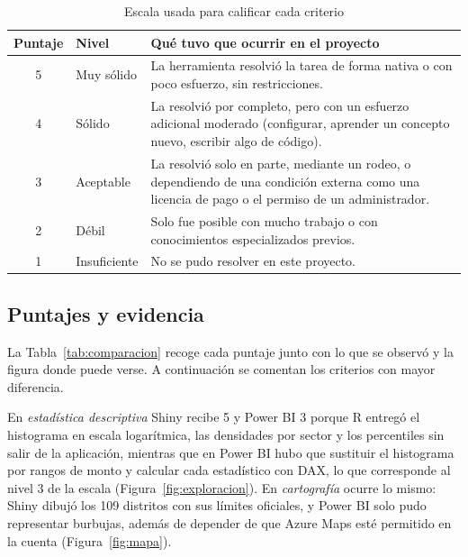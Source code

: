 \documentclass[12pt,a4paper]{article}
\begin{document}
\begin{table}[H]\centering\small
\caption{Escala usada para calificar cada criterio}\label{tab:escala}
\begin{tabularx}{\textwidth}{c l X}
\toprule
\textbf{Puntaje} & \textbf{Nivel} & \textbf{Qué tuvo que ocurrir en el proyecto} \\ \midrule
5 & Muy sólido & La herramienta resolvió la tarea de forma nativa o con poco esfuerzo, sin
restricciones. \\
4 & Sólido & La resolvió por completo, pero con un esfuerzo adicional moderado (configurar, aprender un
concepto nuevo, escribir algo de código). \\
3 & Aceptable & La resolvió solo en parte, mediante un rodeo, o dependiendo de una condición externa como
una licencia de pago o el permiso de un administrador. \\
2 & Débil & Solo fue posible con mucho trabajo o con conocimientos especializados previos. \\
1 & Insuficiente & No se pudo resolver en este proyecto. \\ \bottomrule
\end{tabularx}
\end{table}

\subsection{Puntajes y evidencia}
La Tabla~\ref{tab:comparacion} recoge cada puntaje junto con lo que se observó y la figura donde puede
verse. A continuación se comentan los criterios con mayor diferencia.

En \emph{estadística descriptiva} Shiny recibe 5 y Power BI 3 porque R entregó el histograma en escala
logarítmica, las densidades por sector y los percentiles sin salir de la aplicación, mientras que en Power
BI hubo que sustituir el histograma por rangos de monto y calcular cada estadístico con DAX, lo que
corresponde al nivel 3 de la escala (Figura~\ref{fig:exploracion}). En \emph{cartografía} ocurre lo
mismo: Shiny dibujó los 109 distritos con sus límites oficiales, y Power BI solo pudo representar burbujas,
además de depender de que Azure Maps esté permitido en la cuenta (Figura~\ref{fig:mapa}).
\end{document}
